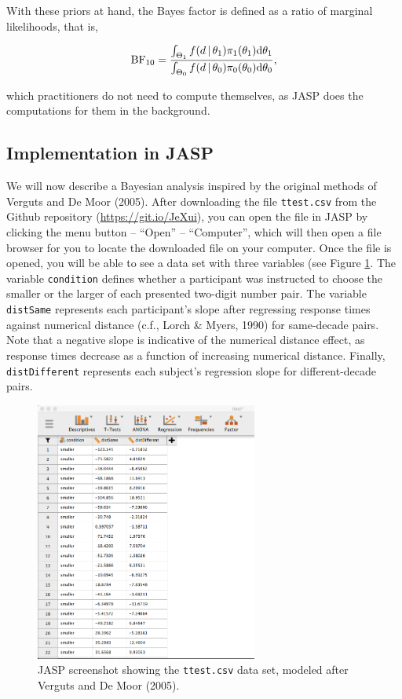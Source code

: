 \documentclass[english,,doc,floatsintext]{apa6}
\begin{document}
With these priors at hand, the Bayes factor is defined as a ratio of marginal likelihoods, that is,

\begin{align}
\textnormal{BF}_{10} = \frac{ \int_{\Theta_{1}} f(d \, | \, \theta_{1}) \pi_{1}(\theta_{1}) \textnormal{d} \theta_{1}}{\int_{\Theta_{0}} f(d \, | \, \theta_{0}) \pi_{0}(\theta_{0}) \textnormal{d} \theta_{0}},
\end{align}

which practitioners do not need to compute themselves, as JASP does the computations for them in the background.

\hypertarget{implementation-in-jasp}{%
\subsection{Implementation in JASP}\label{implementation-in-jasp}}

We will now describe a Bayesian analysis inspired by the original methods of Verguts and De Moor (2005). After downloading the file \texttt{ttest.csv} from the Github repository (\url{https://git.io/JeXui}), you can open the file in JASP by clicking the menu button -- ``Open'' -- ``Computer'', which will then open a file browser for you to locate the downloaded file on your computer. Once the file is opened, you will be able to see a data set with three variables (see Figure \ref{fig:ttestData}. The variable \texttt{condition} defines whether a participant was instructed to choose the smaller or the larger of each presented two-digit number pair. The variable \texttt{distSame} represents each participant's slope after regressing response times against numerical distance (c.f., Lorch \& Myers, 1990) for same-decade pairs. Note that a negative slope is indicative of the numerical distance effect, as response times decrease as a function of increasing numerical distance. Finally, \texttt{distDifferent} represents each subject's regression slope for different-decade pairs.

\begin{figure}
\centering
\includegraphics[width=0.65\textwidth,height=\textheight]{figures/ttestData.png}
\caption{\label{fig:ttestData}JASP screenshot showing the \texttt{ttest.csv} data set, modeled after Verguts and De Moor (2005).}
\end{figure}
\end{document}

